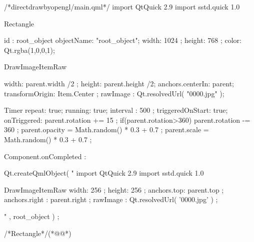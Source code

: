 \label{f000042}    %
\FloatBarrier                                  %
\begin{thebookfilesourceone}[escapeinside={(*@}{@*)},
caption=GoodLuck,
title=\filesourcenumbernameone \thefilesourcenumber
]
/*directdrawbyopengl/main.qml*/
import QtQuick 2.9
import sstd.quick 1.0

Rectangle{
    id : root_object
    objectName: "root_object";
    width: 1024 ;
    height: 768 ;
    color: Qt.rgba(1,0,0,1);

    DrawImageItemRaw {

        width: parent.width /2  ;
        height: parent.height /2;
        anchors.centerIn: parent;
        transformOrigin: Item.Center ;
        rawImage : Qt.resolvedUrl( "0000.jpg" );

        Timer{
            repeat: true;
            running: true;
            interval : 500 ;
            triggeredOnStart: true;
            onTriggered: {
                parent.rotation += 15 ;
                if(parent.rotation>360){
                    parent.rotation -= 360 ;
                }
                parent.opacity = Math.random() * 0.3 + 0.7 ;
                parent.scale = Math.random() * 0.3 + 0.7   ;
            }
        }

    }


    Component.onCompleted : {
        Qt.createQmlObject(
"
import QtQuick 2.9
import sstd.quick 1.0

DrawImageItemRaw {
    width: 256   ;
    height: 256  ;
    anchors.top: parent.top                 ;
    anchors.right : parent.right            ;
    rawImage : Qt.resolvedUrl( '0000.jpg' ) ;
}

" , root_object  ) ;
    }

}/*Rectangle*/(*@\marginpar[\hfill\setlength\fboxsep{2pt}\fbox{\footnotesize{\kaishu\parbox{1em}{\setlength{\baselineskip}{2pt}\filesourcenumbernameone}}\footnotesize{\thefilesourcenumber}}]{\setlength\fboxsep{2pt}\fbox{\footnotesize{\kaishu\parbox{1em}{\setlength{\baselineskip}{2pt}\filesourcenumbernameone}}\footnotesize{\thefilesourcenumber}}}@*)\end{thebookfilesourceone}          %
\addtocounter{lstlisting}{-1}   %


